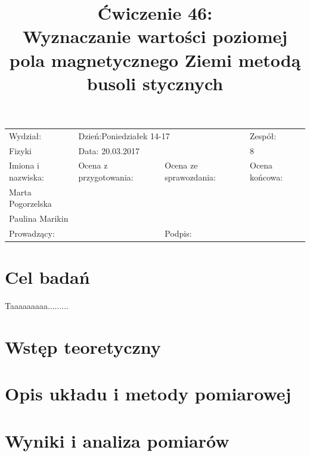\documentclass[a4paper,10pt]{article}
\def\arraystretch{1.2}
\begin{document}
\begin{table}
  \centering
  \def\arraystretch{1.5}
    \begin{tabular}{|l|l|l|l|} \hline
    Wydział:           & \multicolumn{2}{l|}{Dzień:Poniedziałek 14-17}    &Zespół:  \\
    Fizyki             &    \multicolumn{2}{l|}{Data: 20.03.2017}         &8             \\\hline
    Imiona i nazwiska: &Ocena z przygotowania:  &Ocena ze sprawozdania:   &Ocena końcowa: \\
    Marta Pogorzelska  &                        &                         &                \\
    Paulina Marikin    &                        &                         &\\\hline
    \multicolumn{2}{|l|}{Prowadzący:                 } &\multicolumn{2}{l|}{Podpis:             }  \\\hline
  \end{tabular}
\end{table}


\title{Ćwiczenie 46:\\Wyznaczanie wartości poziomej pola magnetycznego Ziemi metodą busoli stycznych}
\date{}
\maketitle{}

\section{Cel badań}
Taaaaaaaaa.........

\section{Wstęp teoretyczny}


\section{Opis układu i metody pomiarowej}


\section{Wyniki i analiza pomiarów}
\end{document}
